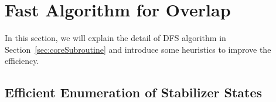 \documentclass[a4paper, onecolumn, 11pt, longbibliography]{quantumarticle}
\begin{document}



\appendix

\section{Fast Algorithm for Overlap}

In this section, we will explain the detail of
DFS algorithm in Section~\ref{sec:coreSubroutine}
and introduce some heuristics to improve the efficiency.

\subsection{Efficient Enumeration of Stabilizer States}
\label{sec:efficientEnumeration}
\end{document}
